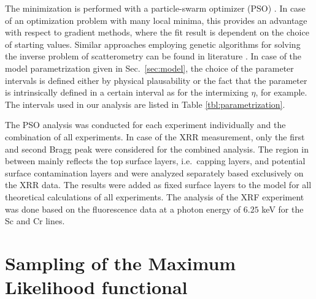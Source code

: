 The minimization is performed with a particle-swarm optimizer (PSO) \cite{Kennedy2010}. In case of an optimization problem with many local minima, this provides an advantage with respect to gradient methods, where the fit result is dependent on the choice of starting values. Similar approaches employing genetic algorithms for solving the inverse problem of scatterometry can be found in literature \cite{del2000modeling}. In case of the model parametrization given in Sec.~\ref{sec:model}, the choice of the parameter intervals is defined either by physical plausability or the fact that the parameter is intrinsically defined in a certain interval as for the intermixing $\eta$, for example. The intervals used in our analysis are listed in Table \ref{tbl:parametrization}.

The PSO analysis was conducted for each experiment individually and the combination of all experiments. In case of the XRR measurement, only the first and second Bragg peak were considered for the combined analysis. The region in between mainly reflects the top surface layers, i.e.~capping layers, and potential surface contamination layers and were analyzed separately based exclusively on the XRR data. The results were added as fixed surface layers to the model for all theoretical calculations of all experiments. The analysis of the XRF experiment was done based on the fluorescence data at a photon energy of $6.25$ keV for the Sc and Cr lines.


\section{Sampling of the Maximum Likelihood functional}

